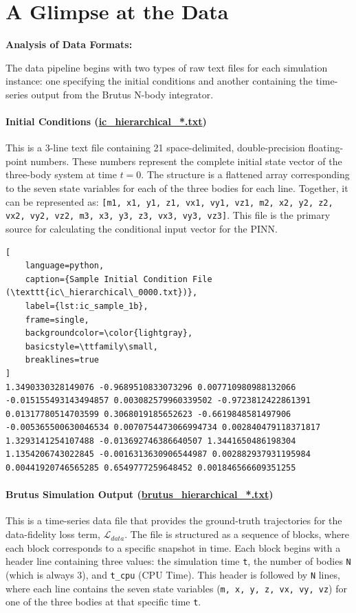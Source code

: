 \section{A Glimpse at the Data}



\textbf{Analysis of Data Formats:}

The data pipeline begins with two types of raw text files for each simulation instance: one specifying the initial conditions and another containing the time-series output from the Brutus N-body integrator.

\paragraph{Initial Conditions (\url{ic_hierarchical_*.txt})}
This is a 3-line text file containing 21 space-delimited, double-precision floating-point numbers. 
These numbers represent the complete initial state vector of the three-body system at time $t=0$. 
The structure is a flattened array corresponding to the seven state variables for each of the three bodies for each line. Together,
it can be represented as: 
\texttt{[m1, x1, y1, z1, vx1, vy1, vz1, m2, x2, y2, z2, vx2, vy2, vz2, m3, x3, y3, z3, vx3, vy3, vz3]}. 
This file is the primary source for calculating the conditional input vector for the PINN.

\begin{lstlisting}[
    language=python,
    caption={Sample Initial Condition File (\texttt{ic\_hierarchical\_0000.txt})},
    label={lst:ic_sample_1b},
    frame=single,
    backgroundcolor=\color{lightgray},
    basicstyle=\ttfamily\small,
    breaklines=true
]
1.3490330328149076 -0.9689510833073296 0.007710980988132066 -0.015155493143494857 0.003082579960339502 -0.9723812422861391 0.01317780514703599 0.3068019185652623 -0.6619848581497906 -0.005365500630046534 0.0070754473066994734 0.002840479118371817 1.3293141254107488 -0.013692746386640507 1.3441650486198304 1.1354206743022845 -0.0016313630906544987 0.002882937931195984 0.00441920746565285 0.6549777259648452 0.001846566609351255
\end{lstlisting}

\paragraph{Brutus Simulation Output (\url{brutus_hierarchical_*.txt})}
This is a time-series data file that provides the ground-truth 
trajectories for the data-fidelity loss term, $\mathcal{L}_{data}$. The file is structured as a sequence of blocks, 
where each block corresponds to a specific snapshot in time. Each block begins with a header line containing three values: 
the simulation time \texttt{t}, the number of bodies \texttt{N} (which is always 3), and \texttt{t\_cpu} (CPU Time). 
This header is followed by \texttt{N} lines, where each line contains the seven state variables 
(\texttt{m, x, y, z, vx, vy, vz}) for one of the three bodies at that specific time \texttt{t}.

